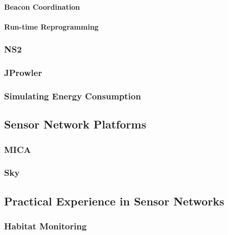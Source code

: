 \paragraph{Beacon Coordination}
\cite{Dunkels:2011:ALB:1966251.1966270} %

\paragraph{Run-time Reprogramming}
\cite{Dunkels:2006:RDL:1182807.1182810} %

\subsubsection*{NS2}

\subsubsection*{JProwler}

\subsubsection*{Simulating Energy Consumption}
\cite{Shnayder04}


\subsection{Sensor Network Platforms}

\subsubsection*{MICA}
\cite{Mica2002}

\subsubsection*{Sky}


\subsection{Practical Experience in Sensor Networks}
\label{sec:lit-review-practical-experience}

\subsubsection*{Habitat Monitoring}

